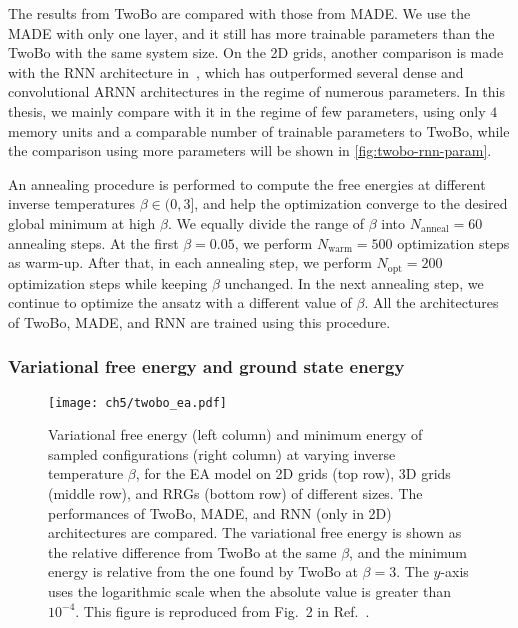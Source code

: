 The results from TwoBo are compared with those from MADE. We use the MADE with only one layer, and it still has more trainable parameters than the TwoBo with the same system size. On the 2D grids, another comparison is made with the RNN architecture in~\cite{hibat2021variational}, which has outperformed several dense and convolutional ARNN architectures in the regime of numerous parameters. In this thesis, we mainly compare with it in the regime of few parameters, using only $4$ memory units and a comparable number of trainable parameters to TwoBo, while the comparison using more parameters will be shown in \cref{fig:twobo-rnn-param}.

An annealing procedure is performed to compute the free energies at different inverse temperatures $\beta \in (0, 3]$, and help the optimization converge to the desired global minimum at high $\beta$. We equally divide the range of $\beta$ into $N_\text{anneal} = 60$ annealing steps. At the first $\beta = 0.05$, we perform $N_\text{warm} = 500$ optimization steps as warm-up. After that, in each annealing step, we perform $N_\text{opt} = 200$ optimization steps while keeping $\beta$ unchanged. In the next annealing step, we continue to optimize the ansatz with a different value of $\beta$. All the architectures of TwoBo, MADE, and RNN are trained using this procedure.

\subsubsection{Variational free energy and ground state energy}

\begin{figure}[htb]
\centering
\texttt{[image: ch5/twobo\_ea.pdf]}
\caption[TwoBo results of Edwards--Anderson (EA) model]{
Variational free energy (left column) and minimum energy of sampled configurations (right column) at varying inverse temperature $\beta$, for the EA model on 2D grids (top row), 3D grids (middle row), and RRGs (bottom row) of different sizes.
The performances of TwoBo, MADE, and RNN (only in 2D) architectures are compared.
The variational free energy is shown as the relative difference from TwoBo at the same $\beta$, and the minimum energy is relative from the one found by TwoBo at $\beta = 3$.
The $y$-axis uses the logarithmic scale when the absolute value is greater than $10^{-4}$.
This figure is reproduced from Fig.~2 in Ref.~\cite{biazzo2024sparse}.
}
\label{fig:twobo-ea}
\end{figure}

